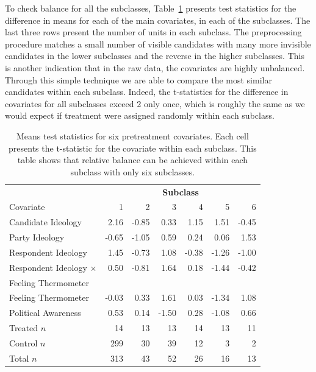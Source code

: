 \documentclass[11pt,titlepage]{article}
\newcommand{\MC}{\multicolumn}
\begin{document}
To check balance for all the subclasses, Table~\ref{tb:kochxsub}
presents test statistics for the difference in means for each of the
main covariates, in each of the subclasses.  The last three rows
present the number of units in each subclass.  The preprocessing
procedure matches a small number of visible candidates with many more
invisible candidates in the lower subclasses and the reverse in the
higher subclasses.  This is another indication that in the raw data,
the covariates are highly unbalanced.  Through this simple technique
we are able to compare the most similar candidates within each
subclass.  Indeed, the t-statistics for the difference in covariates
for all subclasses exceed 2 only once, which is roughly the same as we
would expect if treatment were assigned randomly within each subclass.
\begin{table}[t]
  \begin{center}
    \begin{tabular}{lrrrrrr}
      \hline
      & \MC{6}{c}{\bf Subclass} \\
      Covariate &  1 &  2 &  3 &  4 &  5 &  6 \\
      \hline
      Candidate Ideology & 2.16 & -0.85 & 0.33 & 1.15 & 1.51 & -0.45 \\
      Party Ideology & -0.65 & -1.05 & 0.59 & 0.24 & 0.06 & 1.53 \\
      Respondent Ideology & 1.45 & -0.73 & 1.08 & -0.38 & -1.26 & -1.00 \\
      Respondent Ideology $\times$ & 0.50 & -0.81 & 1.64 & 0.18 &
      -1.44 & -0.42 \\
      \hspace{0.1in} Feeling Thermometer \\
      Feeling Thermometer & -0.03 & 0.33 & 1.61 & 0.03 & -1.34 & 1.08 \\
      Political Awareness & 0.53 & 0.14 & -1.50 & 0.28 & -1.08 & 0.66
      \\ \hline
      Treated $n$& 14 & 13 & 13 & 14 & 13 & 11 \\
      Control $n$& 299 & 30 & 39 & 12 & 3 & 2 \\
      Total $n$  & 313 & 43 & 52 & 26 & 16 & 13 \\
      \hline
    \end{tabular}
    \caption{Means test statistics for six pretreatment covariates.
      Each cell presents the t-statistic for the covariate within each
      subclass.  This table shows that relative balance can be
      achieved within each subclass with only six subclasses.}
    \label{tb:kochxsub}
  \end{center}
\end{table}
\end{document}
